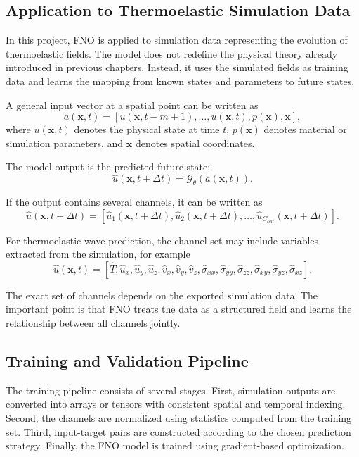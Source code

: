 \documentclass[14pt]{extarticle}
\begin{document}
\subsection{Application to Thermoelastic Simulation Data}

In this project, FNO is applied to simulation data representing the evolution of thermoelastic fields. The model does not redefine the physical theory already introduced in previous chapters. Instead, it uses the simulated fields as training data and learns the mapping from known states and parameters to future states.

A general input vector at a spatial point can be written as
\[
a(\mathbf{x}, t)
=
\left[
u(\mathbf{x}, t-m+1),
\ldots,
u(\mathbf{x}, t),
p(\mathbf{x}),
\mathbf{x}
\right],
\]
where \(u(\mathbf{x}, t)\) denotes the physical state at time \(t\), \(p(\mathbf{x})\) denotes material or simulation parameters, and \(\mathbf{x}\) denotes spatial coordinates.

The model output is the predicted future state:
\[
\hat{u}(\mathbf{x}, t+\Delta t)
=
\mathcal{G}_{\theta}
\left(
a(\mathbf{x}, t)
\right).
\]

If the output contains several channels, it can be written as
\[
\hat{u}(\mathbf{x}, t+\Delta t)
=
\left[
\hat{u}_1(\mathbf{x}, t+\Delta t),
\hat{u}_2(\mathbf{x}, t+\Delta t),
\ldots,
\hat{u}_{C_{out}}(\mathbf{x}, t+\Delta t)
\right].
\]

For thermoelastic wave prediction, the channel set may include variables extracted from the simulation, for example
\[
\hat{u}(\mathbf{x}, t)
=
\left[
\hat{T},
\hat{u}_x,
\hat{u}_y,
\hat{u}_z,
\hat{v}_x,
\hat{v}_y,
\hat{v}_z,
\hat{\sigma}_{xx},
\hat{\sigma}_{yy},
\hat{\sigma}_{zz},
\hat{\sigma}_{xy},
\hat{\sigma}_{yz},
\hat{\sigma}_{xz}
\right].
\]

The exact set of channels depends on the exported simulation data. The important point is that FNO treats the data as a structured field and learns the relationship between all channels jointly.

\subsection{Training and Validation Pipeline}

The training pipeline consists of several stages. First, simulation outputs are converted into arrays or tensors with consistent spatial and temporal indexing. Second, the channels are normalized using statistics computed from the training set. Third, input-target pairs are constructed according to the chosen prediction strategy. Finally, the FNO model is trained using gradient-based optimization.
\end{document}
